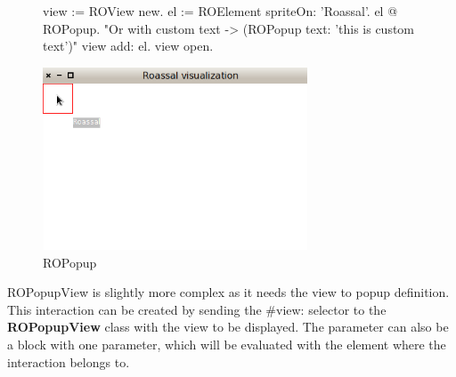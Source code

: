 \documentclass[a4paper,10pt,twoside]{book}
\begin{document}
\begin{figure}[H]
      \begin{minipage}[t]{1\textwidth}
      \vspace{0pt}
     \begin{code}{}
view := ROView new.
el := ROElement spriteOn: 'Roassal'.
el @ ROPopup. "Or with custom text -> (ROPopup text: 'this is custom text')"
view add: el.
view open.
  \end{code}
   \end{minipage}
   \hfill
   \begin{minipage}[t]{1\textwidth}
	 \vspace{0pt} \raggedright
       \centering
		\includegraphics[width=0.7\textwidth]{popup}
   \end{minipage}
\label{fig:popup}
\caption{ROPopup}
\end{figure} 

ROPopupView is slightly more complex as it needs the view to popup definition. This interaction can be created by sending the \#view: selector to the \textbf{ROPopupView} class with the view to be displayed. The parameter can also be a block with one parameter, which will be evaluated with the element where the interaction belongs to.
\end{document}
